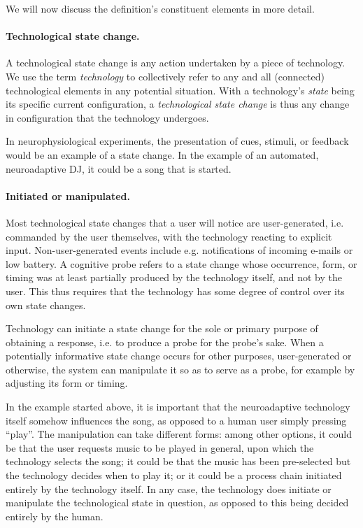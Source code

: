 We will now discuss the definition's constituent elements in more detail.

\paragraph{Technological state change.} A technological state change is any action undertaken by a piece of technology. We use the term \emph{technology} to collectively refer to any and all (connected) technological elements in any potential situation. With a technology's \emph{state} being its specific current configuration, a \emph{technological state change} is thus any change in configuration that the technology undergoes. 

In neurophysiological experiments, the presentation of cues, stimuli, or feedback would be an example of a state change. In the example of an automated, neuroadaptive DJ, it could be a song that is started.

\paragraph{Initiated or manipulated.} Most technological state changes that a user will notice are user-generated, i.e. commanded by the user themselves, with the technology reacting to explicit input. Non-user-generated events include e.g. notifications of incoming e-mails or low battery. A cognitive probe refers to a state change whose occurrence, form, or timing was at least partially produced by the technology itself, and not by the user. This thus requires that the technology has some degree of control over its own state changes.

Technology can initiate a state change for the sole or primary purpose of obtaining a response, i.e. to produce a probe for the probe's sake. When a potentially informative state change occurs for other purposes, user-generated or otherwise, the system can manipulate it so as to serve as a probe, for example by adjusting its form or timing.

In the example started above, it is important that the neuroadaptive technology itself somehow influences the song, as opposed to a human user simply pressing ``play''. The manipulation can take different forms: among other options, it could be that the user requests music to be played in general, upon which the technology selects the song; it could be that the music has been pre-selected but the technology decides when to play it; or it could be a process chain initiated entirely by the technology itself. In any case, the technology does initiate or manipulate the technological state in question, as opposed to this being decided entirely by the human.

